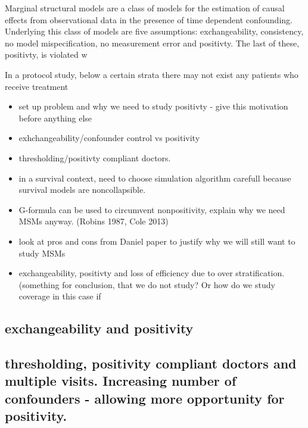 \documentclass[11pt]{article}
\begin{document}
Marginal structural models are a class of models for the estimation of
causal effects from observational data in the presence of time dependent
confounding. Underlying this class of models are five assumptions:
exchangeability, consistency, no model mispecification, no measurement
error and positivty. The last of these, positivty, is violated w

In a protocol study, below a certain strata there may not exist any
patients who receive treatment

\begin{itemize}
\item
  set up problem and why we need to study positivty - give this
  motivation before anything else
\item
  exhchangeability/confounder control vs positivity
\item
  thresholding/positivty compliant doctors.
\item
  in a survival context, need to choose simulation algorithm carefull
  because survival models are noncollapsible.
\item
  G-formula can be used to circumvent nonpositivity, explain why we need
  MSMs anyway. (Robins 1987, Cole 2013)
\item
  look at pros and cons from Daniel paper to justify why we will still
  want to study MSMs
\item
  exchangeability, positivty and loss of efficiency due to over
  stratification. (something for conclusion, that we do not study? Or
  how do we study coverage in this case if
\end{itemize}

\subsection{exchangeability and
positivity}\label{exchangeability-and-positivity}

\subsection{thresholding, positivity compliant doctors and multiple
visits. Increasing number of confounders - allowing more opportunity for
positivity.}\label{thresholding-positivity-compliant-doctors-and-multiple-visits.-increasing-number-of-confounders---allowing-more-opportunity-for-positivity.}
\end{document}

